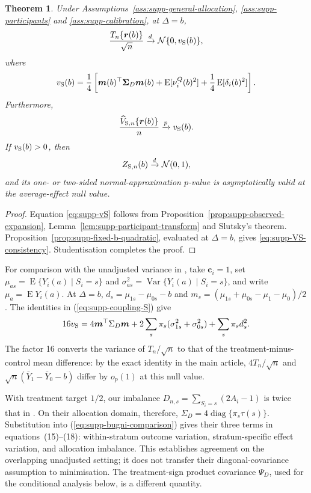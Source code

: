 \documentclass[12pt,a4paper]{article}
\newtheorem{theorem}{Theorem}
\theoremstyle{definition}
\theoremstyle{remark}\newtheorem{remark}{Remark}
\numberwithin{equation}{section}
\newcommand{\E}{\operatorname{E}}
\newcommand{\Var}{\operatorname{Var}}
\begin{document}
\begin{theorem}\label{thm:supp-sampling}
Under Assumptions~\ref{ass:supp-general-allocation}, \ref{ass:supp-participants} and \ref{ass:supp-calibration}, at $\Delta=b$,
\begin{equation}\label{eq:supp-vS}
\frac{T_n\{\bm r(b)\}}{\sqrt n}
\xrightarrow{d}
\mathcal N\{0,v_{\rm S}(b)\},
\end{equation}
where
\[
v_{\rm S}(b)
=\frac14\left[
\bm m(b)^\top\bm\Sigma_D\bm m(b)
+\E[\nu_i^Q(b)^2]
+\frac14\E[\delta_i(b)^2]
\right].
\]
Furthermore,
\begin{equation}\label{eq:supp-VS-consistency}
\frac{\widehat V_{{\rm S},n}\{\bm r(b)\}}n
\xrightarrow{p} v_{\rm S}(b).
\end{equation}
If $v_{\rm S}(b)>0$, then
\[
Z_{{\rm S},n}(b)
\xrightarrow{d}
\mathcal N(0,1),
\]
and its one- or two-sided normal-approximation $p$-value is asymptotically valid at the average-effect null value.
\end{theorem}

\begin{proof}
Equation \eqref{eq:supp-vS} follows from Proposition~\ref{prop:supp-observed-expansion}, Lemma~\ref{lem:supp-participant-transform} and Slutsky's theorem. Proposition~\ref{prop:supp-fixed-b-quadratic}, evaluated at $\Delta=b$, gives \eqref{eq:supp-VS-consistency}. Studentisation completes the proof.
\end{proof}

For comparison with the unadjusted variance in \citet{BugniCanayShaikh2018}, take $\bm c_i=1$, set $\mu_{as}=\E\{Y_i(a)\mid S_i=s\}$ and $\sigma_{as}^2=\Var\{Y_i(a)\mid S_i=s\}$, and write $\mu_a=\E Y_i(a)$. At $\Delta=b$, $d_s=\mu_{1s}-\mu_{0s}-b$ and $m_s=(\mu_{1s}+\mu_{0s}-\mu_1-\mu_0)/2$. The identities in (\ref{eq:supp-coupling-S}) give
\begin{equation}\label{eq:supp-bugni-comparison}
 16v_{\rm S}
 =4\bm m^\top\Sigma_D\bm m
  +2\sum_s\pi_s(\sigma_{1s}^2+\sigma_{0s}^2)
  +\sum_s\pi_s d_s^2.
\end{equation}
The factor 16 converts the variance of $T_n/\sqrt n$ to that of the treatment-minus-control mean difference: by the exact identity in the main article, $4T_n/\sqrt n$ and $\sqrt n(\bar Y_1-\bar Y_0-b)$ differ by $o_p(1)$ at this null value.

With treatment target $1/2$, our imbalance $D_{n,s}=\sum_{S_i=s}(2A_i-1)$ is twice that in \citet{BugniCanayShaikh2018}. On their allocation domain, therefore, $\Sigma_D=4\operatorname{diag}\{\pi_s\tau(s)\}$. Substitution into (\ref{eq:supp-bugni-comparison}) gives their three terms in equations~(15)--(18): within-stratum outcome variation, stratum-specific effect variation, and allocation imbalance. This establishes agreement on the overlapping unadjusted setting; it does not transfer their diagonal-covariance assumption to minimisation. The treatment-sign product covariance $\Psi_D$, used for the conditional analysis below, is a different quantity.
\end{document}
